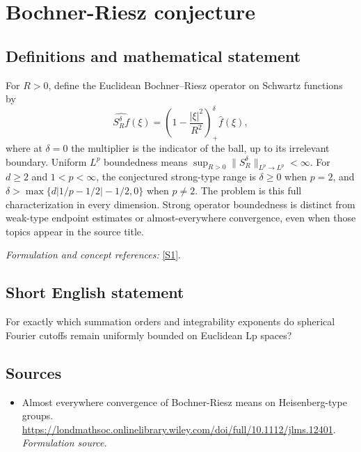 \documentclass[11pt]{article}
\begin{document}
\section*{\texorpdfstring{Bochner-Riesz conjecture}{Bochner-Riesz conjecture}}\label{statement}
\subsection{Definitions and mathematical statement}
For $R>0$, define the Euclidean Bochner--Riesz operator on Schwartz functions by
\[
 \widehat{S_R^\delta f}(\xi)=\left(1-\frac{|\xi|^2}{R^2}\right)_+^\delta\widehat f(\xi),
\]
where at $\delta=0$ the multiplier is the indicator of the ball, up to its irrelevant boundary. Uniform $L^p$ boundedness means
$\sup_{R>0}\|S_R^\delta\|_{L^p\to L^p}<\infty$.
For $d\ge2$ and $1<p<\infty$, the conjectured strong-type range is $\delta\ge0$ when $p=2$, and
$\delta>\max\{d|1/p-1/2|-1/2,0\}$ when $p\ne2$.
The problem is this full characterization in every dimension. Strong operator boundedness is distinct from weak-type endpoint estimates or almost-everywhere convergence, even when those topics appear in the source title.
\par\smallskip\textit{Formulation and concept references:} \href{https://londmathsoc.onlinelibrary.wiley.com/doi/full/10.1112/jlms.12401}{[S1]}.

\subsection{Short English statement}
For exactly which summation orders and integrability exponents do spherical Fourier cutoffs remain uniformly bounded on Euclidean Lp spaces?
\subsection{Sources}
\begin{itemize}
\item[S1]Almost everywhere convergence of Bochner-Riesz means on Heisenberg-type groups.
\url{https://londmathsoc.onlinelibrary.wiley.com/doi/full/10.1112/jlms.12401}.
\textit{Formulation source.}
\end{itemize}
\end{document}
